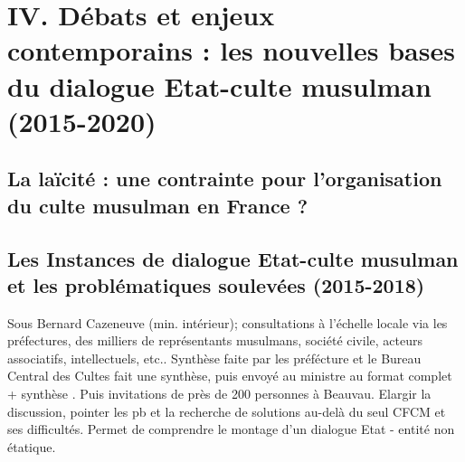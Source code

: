 \chapter{IV. Débats et enjeux contemporains : les nouvelles bases du dialogue Etat-culte
musulman (2015-2020)}


\section{La laïcité : une contrainte pour l’organisation du culte musulman en France ?}

\section{Les Instances de dialogue Etat-culte musulman et les problématiques
soulevées (2015-2018)}

Sous Bernard Cazeneuve (min. intérieur); consultations à l’échelle locale via les préfectures, des milliers de représentants musulmans, société civile, acteurs associatifs, intellectuels, etc.. Synthèse faite par les préfécture et le Bureau Central des Cultes fait une synthèse, puis envoyé au ministre au format complet + synthèse . Puis invitations de près de 200 personnes à Beauvau. Elargir la discussion, pointer les pb et la recherche de solutions au-delà du seul CFCM et ses difficultés. Permet de comprendre le montage d'un dialogue Etat - entité non étatique.

